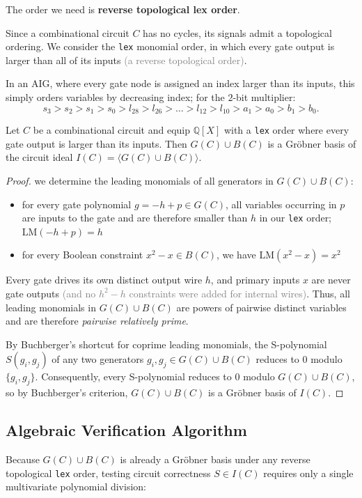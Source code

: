\documentclass[a4paper, 11pt]{report}
\begin{document}
The order we need is \textbf{reverse topological lex order}.

Since a combinational circuit $C$ has no cycles, its signals admit a topological ordering. We consider the \texttt{lex} monomial order, in which every gate output is larger than all of its inputs \textcolor{gray}{(a reverse topological order)}. 

In an AIG, where every gate node is assigned an index larger than its inputs, this simply orders variables by decreasing index; for the $2$-bit multiplier:
$$
    s_3 > s_2 > s_1 > s_0 > l_{28} > l_{26} > \dots > l_{12} > l_{10} > a_1 > a_0 > b_1 > b_0.
$$

\begin{thmframe}{}{}
Let $C$ be a combinational circuit and equip $\mathbb{Q}[X]$ with a \texttt{lex} order where every gate output is larger than its inputs. Then $G(C) \cup B(C)$ is a Gr\"obner basis of the circuit ideal $I(C) = \langle G(C) \cup B(C) \rangle$.
\end{thmframe}

\begin{proof}
we determine the leading monomials of all generators in $G(C) \cup B(C)$:
\begin{itemize}
    \item for every gate polynomial $g = -h + p \in G(C)$, all variables occurring in $p$ are inputs to the gate and are therefore smaller than $h$ in our \texttt{lex} order; $\text{LM}(-h + p) = h$
    \item for every Boolean constraint $x^2 - x \in B(C)$, we have $\text{LM}(x^2 - x) = x^2$
\end{itemize}
Every gate drives its own distinct output wire $h$, and primary inputs $x$ are never gate outputs \textcolor{gray}{(and no $h^2 - h$ constraints were added for internal wires)}. Thus, all leading monomials in $G(C) \cup B(C)$ are powers of pairwise distinct variables and are therefore \emph{pairwise relatively prime}.

By Buchberger's shortcut for coprime leading monomials, the S-polynomial $S(g_i, g_j)$ of any two generators $g_i, g_j \in G(C) \cup B(C)$ reduces to $0$ modulo $\{g_i, g_j\}$. Consequently, every S-polynomial reduces to $0$ modulo $G(C) \cup B(C)$, so by Buchberger's criterion, $G(C) \cup B(C)$ is a Gr\"obner basis of $I(C)$.
\end{proof}

\subsection{Algebraic Verification Algorithm}
Because $G(C) \cup B(C)$ is already a Gr\"obner basis under any reverse topological \texttt{lex} order, testing circuit correctness $S \in I(C)$ requires only a single multivariate polynomial division:
\end{document}
